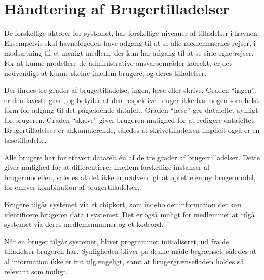 \section{Håndtering af Brugertilladelser} %
\label{tilladelser}

De forskellige aktører for systemet, har forskellige niveauer af tilladelser i havnen. Eksempelvis skal havnefogeden have adgang til at se alle medlemmernes rejser, i modsætning til et menigt medlem, der kun har adgang til at se sine egne rejser. For at kunne modellere de administrative ansvarsområder korrekt, er det nødvendigt at kunne skelne imellem brugere, og deres tilladelser.

Der findes tre grader af brugertilladelse, ingen, læse eller skrive. Graden \enquote{ingen}, er den laveste grad, og betyder at den respektive bruger ikke har nogen som helst form for adgang til det pågældende datafelt. Graden \enquote{læse} gør datafeltet synligt for brugeren. Graden \enquote{skrive} giver brugeren mulighed for at redigere datafeltet. Brugertilladelser er akkumulerende, således at skrivetilladelsen implicit også er en læsetilladelse. 

Alle brugere har for ethvert datafelt én af de tre grader af brugertilladelser. Dette giver mulighed for at differentierer imellem forskellige instanser af brugermodellen, således at det ikke er nødvendigt at oprette en ny brugermodel, for enhver kombination af brugertilladelser.

Brugere tilgår systemet via et chipkort, som indeholder information der kan identificere brugeren data i systemet. Det er også muligt for medlemmer at tilgå systemet via deres medlemsnummer og et kodeord.

Når en bruger tilgår systemet, bliver programmet initialiseret, ud fra de tilladelser brugeren har. Synligheden bliver på denne måde begrænset, således at al information ikke er frit tilgængeligt, samt at brugergrænsefladen holdes så relevant som muligt.


